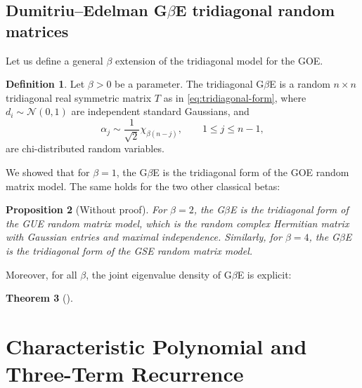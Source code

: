 \documentclass[letterpaper,11pt,oneside,reqno]{article}
\numberwithin{equation}{section}
\newtheorem{proposition}{Proposition}[section]
\newtheorem{theorem}[proposition]{Theorem}
\theoremstyle{definition}
\newtheorem{definition}[proposition]{Definition}
\begin{document}
\subsection{Dumitriu--Edelman G$\beta$E tridiagonal random matrices}

Let us define a general $\beta$ extension of the tridiagonal model for the
GOE.

\begin{definition}
	\label{def:tridiagonal-model-general-beta}
	Let $\beta>0$ be a parameter.
	The tridiagonal G$\beta$E is a random $n\times n$
	tridiagonal real symmetric
	matrix $T$ as in
	\eqref{eq:tridiagonal-form},
	where $d_i\sim \mathcal{N}(0,1)$ are independent standard Gaussians,
	and
	\begin{equation*}
		\alpha_j\sim \frac{1}{\sqrt 2}\chi_{\beta(n-j)},\qquad
		1\le j\le n-1,
	\end{equation*}
	are chi-distributed random variables.
\end{definition}

We showed that for $\beta=1$,
the G$\beta$E is the tridiagonal form of the GOE random matrix model.
The same holds for the two other classical betas:
\begin{proposition}[Without proof]
	\label{prop:tridiagonal-model-beta-classical}
	For $\beta=2$, the G$\beta$E is the tridiagonal form of the GUE random matrix model,
	which is the random complex Hermitian matrix with Gaussian entries and maximal
	independence. Similarly, for $\beta=4$,
	the G$\beta$E is the tridiagonal form of the GSE random matrix model.
\end{proposition}


Moreover, for all $\beta$, the joint eigenvalue density of G$\beta$E is
explicit:
\begin{theorem}[\cite{dumitriu2002matrix}]
\end{theorem}





















\section{Characteristic Polynomial and Three-Term Recurrence}
\label{sec:3term}
\end{document}
